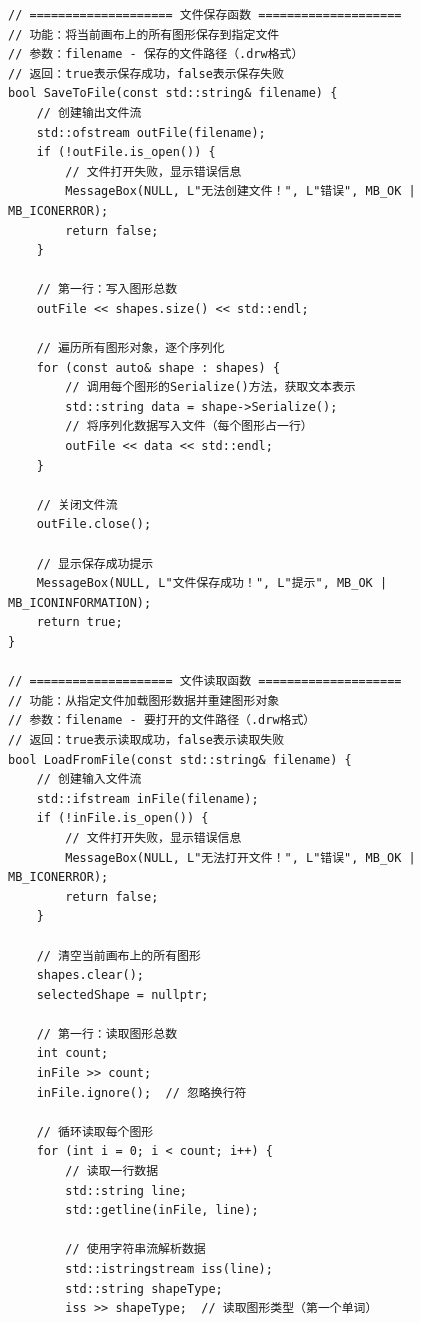 \documentclass[12pt,a4paper]{article}
\begin{document}
\begin{lstlisting}[caption=文件读取与保存函数实现]
// ==================== 文件保存函数 ====================
// 功能：将当前画布上的所有图形保存到指定文件
// 参数：filename - 保存的文件路径（.drw格式）
// 返回：true表示保存成功，false表示保存失败
bool SaveToFile(const std::string& filename) {
    // 创建输出文件流
    std::ofstream outFile(filename);
    if (!outFile.is_open()) {
        // 文件打开失败，显示错误信息
        MessageBox(NULL, L"无法创建文件！", L"错误", MB_OK | MB_ICONERROR);
        return false;
    }
    
    // 第一行：写入图形总数
    outFile << shapes.size() << std::endl;
    
    // 遍历所有图形对象，逐个序列化
    for (const auto& shape : shapes) {
        // 调用每个图形的Serialize()方法，获取文本表示
        std::string data = shape->Serialize();
        // 将序列化数据写入文件（每个图形占一行）
        outFile << data << std::endl;
    }
    
    // 关闭文件流
    outFile.close();
    
    // 显示保存成功提示
    MessageBox(NULL, L"文件保存成功！", L"提示", MB_OK | MB_ICONINFORMATION);
    return true;
}

// ==================== 文件读取函数 ====================
// 功能：从指定文件加载图形数据并重建图形对象
// 参数：filename - 要打开的文件路径（.drw格式）
// 返回：true表示读取成功，false表示读取失败
bool LoadFromFile(const std::string& filename) {
    // 创建输入文件流
    std::ifstream inFile(filename);
    if (!inFile.is_open()) {
        // 文件打开失败，显示错误信息
        MessageBox(NULL, L"无法打开文件！", L"错误", MB_OK | MB_ICONERROR);
        return false;
    }
    
    // 清空当前画布上的所有图形
    shapes.clear();
    selectedShape = nullptr;
    
    // 第一行：读取图形总数
    int count;
    inFile >> count;
    inFile.ignore();  // 忽略换行符
    
    // 循环读取每个图形
    for (int i = 0; i < count; i++) {
        // 读取一行数据
        std::string line;
        std::getline(inFile, line);
        
        // 使用字符串流解析数据
        std::istringstream iss(line);
        std::string shapeType;
        iss >> shapeType;  // 读取图形类型（第一个单词）
        

\end{lstlisting}
\end{document}

